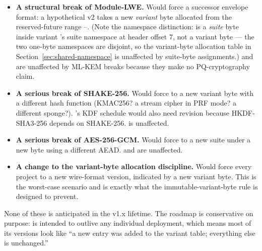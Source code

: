 \begin{itemize}
\item \textbf{A structural break of Module-LWE.} Would force a successor envelope format: a hypothetical \tesseraseal{} v2 takes a new \emph{variant} byte allocated from the reserved-future range --. (Note the namespace distinction:  is a \emph{suite} byte inside variant 's suite namespace at header offset 7, not a variant byte --- the two one-byte namespaces are disjoint, so the variant-byte allocation table in Section~\ref{sec:shared-namespace} is unaffected by suite-byte assignments.) \tesseraid{} and \tesserahash{} are unaffected by ML-KEM breaks because they make no PQ-cryptography claim.
\item \textbf{A serious break of SHAKE-256.} Would force \tesserahash{} to a new variant byte with a different hash function (KMAC256? a stream cipher in PRF mode? a different sponge?). \tesseraseal{}'s KDF schedule would also need revision because HKDF-SHA3-256 depends on SHAKE-256. \tesseraid{} is unaffected.
\item \textbf{A serious break of AES-256-GCM.} Would force \tesseraseal{} to a new suite under a new byte using a different AEAD. \tesseraid{} and \tesserahash{} are unaffected.
\item \textbf{A change to the variant-byte allocation discipline.} Would force every project to a new wire-format version, indicated by a new variant byte. This is the worst-case scenario and is exactly what the immutable-variant-byte rule is designed to prevent.
\end{itemize}

None of these is anticipated in the v1.x lifetime. The roadmap is conservative on purpose: \tessera{} is intended to outlive any individual deployment, which means most of its versions look like ``a new entry was added to the variant table; everything else is unchanged.''
